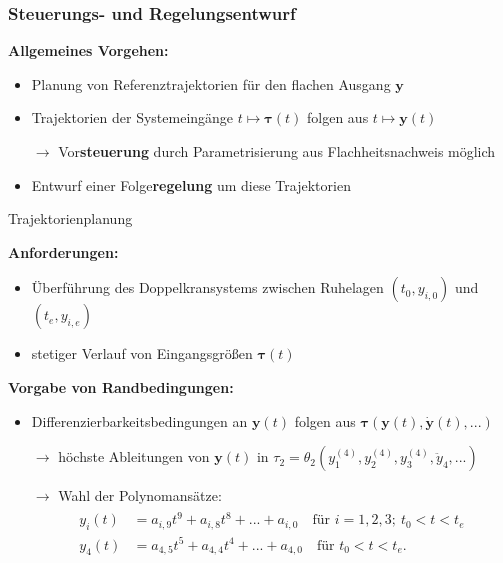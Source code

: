 \documentclass[
	ngerman,
	10pt,				%
	aspectratio=169, 	%
	xcolor=dvipsnames
]{beamer}
\begin{document}

\begin{frame}[label=control]
	\frametitle{Steuerungs- und Regelungsentwurf}
	\textbf{Allgemeines Vorgehen:}
	\begin{itemize}
		\item Planung von Referenztrajektorien für den flachen Ausgang $\mathbf{y}$
		\pause
		\item Trajektorien der Systemeingänge $t \mapsto \boldsymbol{\tau}(t)$ folgen aus $t \mapsto \mathbf{y}(t)$
		\pause
		\item[$\rightarrow$] Vor\textbf{steuerung} durch Parametrisierung aus Flachheitsnachweis möglich
		\pause
		\item Entwurf einer Folge\textbf{regelung} um diese Trajektorien
	\end{itemize}

\end{frame}


\begin{frame}[t,fragile,label=trajektorien_1]{\large Trajektorienplanung}
	
	\textbf{Anforderungen:}
	\begin{itemize}
		\pause
		\item Überführung des Doppelkransystems zwischen Ruhelagen $(t_0, y_{i, 0})$ und $(t_e, y_{i, e})$
		\pause
		\item stetiger Verlauf von Eingangsgrößen $\boldsymbol{\tau}(t)$
	\end{itemize}
	
	\pause
	\bigskip
	\textbf{Vorgabe von Randbedingungen:}
	\begin{itemize}
		\pause
		\item Differenzierbarkeitsbedingungen an $\mathbf{y}(t)$ folgen aus $\boldsymbol{\tau}(\mathbf{y}(t), \dot{\mathbf{y}}(t), ...)$
		\pause
		\item[$\rightarrow$] höchste Ableitungen von $\mathbf{y}(t)$ in $\tau_2 = \theta_2 \left(y_1^{(4)}, y_2^{(4)}, y_3^{(4)}, \ddot{y}_4, ... \right)$
		\pause
		\item[$\rightarrow$] Wahl der Polynomansätze:
		\begin{align*}
			\begin{split}
				y_i(t) &= a_{i, 9} t^9 + a_{i, 8} t^8 + ... + a_{i, 0} \quad \text{für }  i = 1,2,3; \ t_0 < t < t_e \\
				y_4(t) &= a_{4, 5} t^5 + a_{4, 4} t^4 + ... + a_{4, 0} \quad \text{für } t_0 < t < t_e.
			\end{split}
		\end{align*}
		
	\end{itemize}
	
\end{frame}
\end{document}
